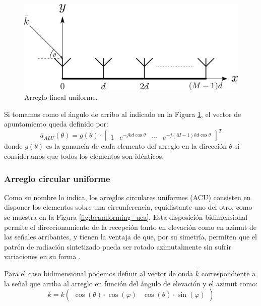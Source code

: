 \begin{figure}[ht!]
    \centering
    \includegraphics[width=0.7\linewidth]{images/02-Beamforming/ula.png}
    \caption{Arreglo lineal uniforme.}
    \label{fig:beamforming_ula}
\end{figure}

Si tomamos como el ángulo de arribo al indicado en la Figura \ref{fig:beamforming_ula}, el vector de apuntamiento queda definido por:
\begin{equation}
    \bar{a}_{ALU}(\theta) = g(\theta) \cdot \begin{bmatrix}
        1 & e^{-jkd\cos \theta} & \cdots & e^{-j(M-1)kd \cos \theta}
    \end{bmatrix}^T
\end{equation}
donde $g(\theta)$ es la ganancia de cada elemento del arreglo en la dirección $\theta$ si consideramos que todos los elementos son idénticos.

\subsubsection{Arreglo circular uniforme}

Como su nombre lo indica, los arreglos circulares uniformes (ACU) consisten en disponer los elementos sobre una circunferencia, equidistante uno del otro, como se muestra en la Figura \ref{fig:beamforming_uca}. Esta disposición bidimensional permite el direccionamiento de la recepción tanto en elevación como en azimut de las señales arribantes, y tienen la ventaja de que, por su simetría, permiten que el patrón de radiación sintetizado pueda ser rotado azimutalmente sin sufrir variaciones en su forma \cite{bib:Ucasmartantennas}.

Para el caso bidimensional podemos definir al vector de onda $\bar{k}$ correspondiente a la señal que arriba al arreglo en función del ángulo de elevación y el azimut como:
\begin{equation}
    \bar{k} = k \begin{pmatrix}
        \cos(\theta)\cdot \cos(\varphi) & \cos(\theta)\cdot \sin(\varphi)
    \end{pmatrix}
    \label{eq:beamforming_k}
\end{equation}

